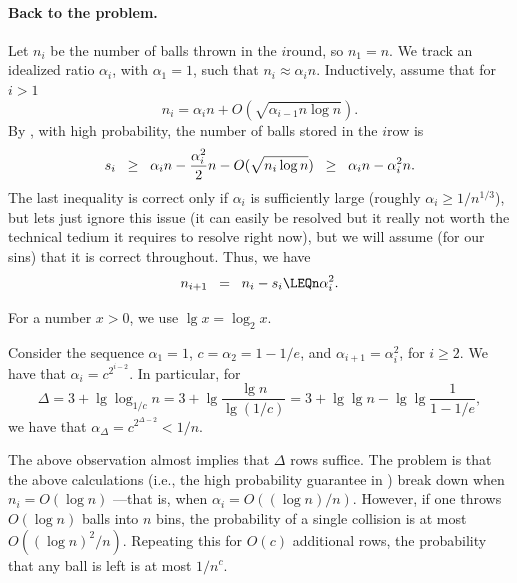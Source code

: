 \paragraph*{Back to the problem.}

Let $n_i$ be the number of balls thrown in the $i$\th round, so
$n_1 = n$. We track an idealized ratio $\alpha_i$, with $\alpha_1 = 1$, such that
$n_i \approx \alpha_i n$. Inductively, assume that for $i>1$
\begin{equation*}
    n_i = \alpha_i n + O( \sqrt{ \alpha_{i-1} n \log n} ). 
\end{equation*}
By , with high probability, the number of balls
stored in the $i$\th row is
\begin{equation*}
    s_i
    \mathrel{\;\;\geq\;\;}
    \alpha_i n - \frac{\alpha_i^2}{2} n - O(\sqrt{n_i  \log n})
    \mathrel{\;\;\geq\;\;}
    \alpha_i n - \alpha_i^2 n.
\end{equation*}
The last inequality is correct only if $\alpha_i$ is sufficiently large
(roughly $\alpha_i \geq 1/n^{1/3}$), but lets just ignore this issue (it can
easily be resolved but it really not worth the technical tedium it
requires to resolve right now), but we will assume (for our sins) that it
is correct throughout. Thus, we have
\begin{equation*}
    n_{i+1} \EQ n_i - s_i%
    \LEQ%
    n \alpha_i^2.
\end{equation*}
\begin{defn}
    For a number $x > 0$, we use $\lg x = \log_2 x$.
\end{defn}

\begin{observation}
    Consider the sequence $\alpha_1 =1$, $c = \alpha_2=1-1/e$, and
    $\alpha_{i+1} = \alpha_i^2$, for $i \geq 2$. We have that
    $\alpha_i = c^{2^{i-2}}$. In particular, for
    \begin{equation*}
        \Delta%
        =%
        3 + \lg \log_{1/c} n
        =%
        3 + \lg \frac{\lg n}{\lg (1/c)}
        =
        3 + \lg \lg n  - \lg\lg \frac{1}{1-1/e},
    \end{equation*}
    we have that $\alpha_\Delta = c^{2^{\Delta-2}} < 1/n$.%
\end{observation}

The above observation almost implies that $\Delta$ rows suffice. The
problem is that the above calculations (i.e., the high probability
guarantee in ) break down when $n_i = O(\log n)$
---that is, when $\alpha_i = O((\log n) / n)$. However, if one throws
$O( \log n)$ balls into $n$ bins, the probability of a single collision
is at most $O( (\log n)^2/n)$. Repeating this for $O(c)$ additional rows, the
probability that any ball is left is at most $1/n^c$.

